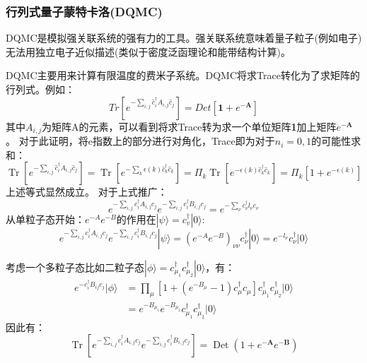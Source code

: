 




\subsubsection{行列式量子蒙特卡洛(DQMC)}
DQMC是模拟强关联系统的强有力的工具。强关联系统意味着量子粒子(例如电子)无法用独立电子近似描述(类似于密度泛函理论和能带结构计算)。

DQMC主要用来计算有限温度的费米子系统。DQMC将求Trace转化为了求矩阵的行列式。例如：
$$Tr[e^{- \sum_{i,j}\widehat{c}^\dagger_i A_{i,j}\widehat{c}_j}]=Det[\textbf{1}+e^{-\textbf{A}}]$$
其中$A_{i,j}$为矩阵A的元素，可以看到将求Trace转为求一个单位矩阵\textbf{1}加上矩阵$e^{-\textbf{A}}$。
对于此证明，将e指数上的部分进行对角化，Trace即为对于$n_i=0,1$的可能性求和：
$$
\operatorname{Tr}\left[e^{-\sum_{i, j} \hat{c}_{i}^{\dagger} A_{i, j} \hat{c}_{j}}\right]=\operatorname{Tr}\left[e^{-\sum_{k} \epsilon(k) \hat{c}_{k}^{\dagger} \hat{c}_{k}}\right]=\Pi_{k} \operatorname{Tr}\left[e^{-\epsilon(k) \hat{c}_{k}^{\dagger} \hat{c}_{k}}\right]=\Pi_{k}\left[1+e^{-\epsilon(k)}\right]
$$
上述等式显然成立。
对于上式推广：
$$
e^{-\sum_{i, j} c_{i}^{\dagger} A_{i, j} c_{j}} e^{-\sum_{i, j} c_{i}^{\dagger} B_{i, j} c_{j}}=e^{-\sum_{\nu} c_{\nu}^{\dagger} l_{\nu} c_{\nu}}
$$
从单粒子态开始：$e^{-A}e^{-B}$的作用在$|\psi \rangle=c^{\dagger}_v|0\rangle$:
$$
e^{-\sum_{i, j} c_{i}^{\dagger} A_{i, j} c_{j}} e^{-\sum_{i, j} c_{i}^{\dagger} B_{i, j} c_{j}}|\psi\rangle=\left(e^{-A} e^{-B}\right)_{\nu \nu} c_{\nu}^{\dagger}|0\rangle=e^{-l_{\nu}} c_{\nu}^{\dagger}|0\rangle
$$

考虑一个多粒子态比如二粒子态$|\phi\rangle=c^\dagger _{\mu_1}c^\dagger _{\mu_2}|0\rangle$，有：
$$
\begin{aligned}
e^{-c_{i}^{\dagger} B_{i j} c_{j}}|\phi\rangle &=\prod_{\mu}\left[1+\left(e^{-B_{\mu}}-1\right) c_{\mu}^{\dagger} c_{\mu}\right] c_{\mu_{1}}^{\dagger} c_{\mu_{2}}^{\dagger}|0\rangle \\
&=e^{-B_{\mu_{1}}} e^{-B_{\mu_{2}}} c_{\mu_{1}}^{\dagger} c_{\mu_{2}}^{\dagger}|0\rangle
\end{aligned}
$$
因此有：
$$
\operatorname{Tr}\left[e^{-\sum_{i, j} c_{i}^{\dagger} A_{i, j} c_{j}} e^{-\sum_{i, j} c_{i}^{\dagger} B_{i, j} c_{j}}\right]=\operatorname{Det}\left(1+e^{-\mathbf{A}} e^{-\mathbf{B}}\right)
$$

